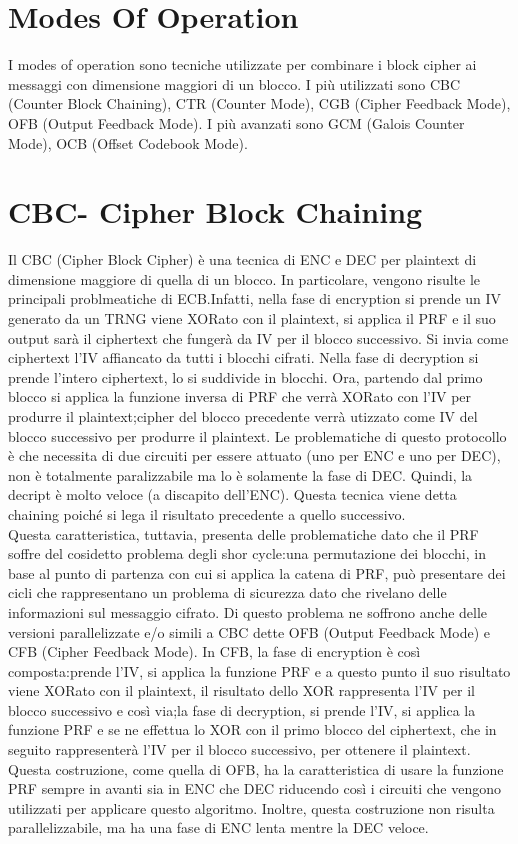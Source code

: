 \documentclass{article}
\begin{document}
\section{Modes Of Operation}
I modes of operation sono tecniche utilizzate per combinare i block cipher ai messaggi con dimensione maggiori di un blocco.\newline
I più utilizzati sono CBC (Counter Block Chaining), CTR (Counter Mode), CGB (Cipher Feedback Mode), OFB (Output Feedback Mode)\@. I più avanzati sono GCM (Galois Counter Mode), OCB (Offset Codebook Mode)\@.
\section{CBC- Cipher Block Chaining}
Il CBC (Cipher Block Cipher) è una tecnica di ENC e DEC per plaintext di dimensione maggiore di quella di un blocco. In particolare, vengono risulte le principali problmeatiche di ECB\@.Infatti, nella fase di encryption si prende un IV generato da un TRNG viene XORato con il plaintext, si applica il PRF e il suo output sarà il ciphertext che fungerà da IV per il blocco successivo. Si invia come ciphertext l'IV affiancato da tutti i blocchi cifrati\@. Nella fase di decryption si prende l'intero ciphertext, lo si suddivide in blocchi\@. Ora, partendo dal primo blocco si applica la funzione inversa di PRF che verrà XORato con l'IV per produrre il plaintext;\@il cipher del blocco precedente verrà utizzato come IV del blocco successivo per produrre il plaintext\@. Le problematiche di questo protocollo è che necessita di due circuiti per essere attuato (uno per ENC e uno per DEC), non è totalmente paralizzabile ma lo è solamente la fase di DEC\@. Quindi, la decript è molto veloce (a discapito dell'ENC)\@.\newline
Questa tecnica viene detta chaining poiché si lega il risultato precedente a quello successivo\@.\\
Questa caratteristica, tuttavia, presenta delle problematiche dato che il PRF soffre del cosidetto problema degli shor cycle:\@presa una permutazione dei blocchi, in base al punto di partenza con cui si applica la catena di PRF, può presentare dei cicli che rappresentano un problema di sicurezza dato che rivelano delle informazioni sul messaggio cifrato\@.\newline
Di questo problema ne soffrono anche delle versioni parallelizzate e/o simili a CBC dette OFB (Output Feedback Mode) e CFB (Cipher Feedback Mode)\@.\newline
In CFB, la fase di encryption è così composta:\@si prende l'IV, si applica la funzione PRF e a questo punto il suo risultato viene XORato con il plaintext, il risultato dello XOR rappresenta l'IV per il blocco successivo e così via;\@per la fase di decryption, si prende l'IV, si applica la funzione PRF e se ne effettua lo XOR con il primo blocco del ciphertext, che in seguito rappresenterà l'IV per il blocco successivo, per ottenere il plaintext\@. Questa costruzione, come quella di OFB, ha la caratteristica di usare la funzione PRF sempre in avanti sia in ENC che DEC riducendo così i circuiti che vengono utilizzati per applicare questo algoritmo\@. Inoltre, questa costruzione non risulta parallelizzabile, ma ha una fase di ENC lenta mentre la DEC veloce\@.\newline
\end{document}
